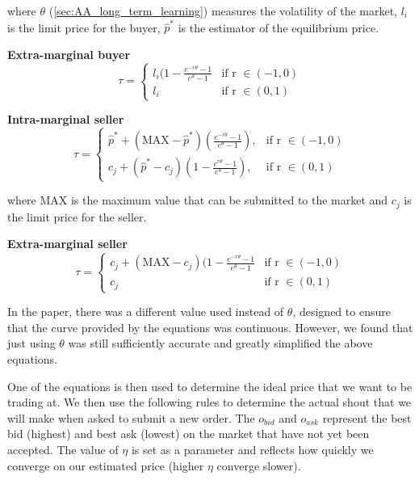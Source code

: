 \documentclass[preprint]{acm_proc_article-sp} %
\begin{document}
where $\theta$ (\ref{sec:AA_long_term_learning}) measures the volatility of the
market, $l_i$ is the limit price for the buyer, $\hat{p}^*$ is the estimator of the
equilibrium price.

\textbf{Extra-marginal buyer}
\begin{equation}
    \label{eqn:extrabuyer}
    \tau =
    \begin{cases}
        l_i(1-\frac{e^{-r\theta}-1}{e^\theta-1} &  \text{if r } \in (-1,0)  \\
        l_i & \text{if r } \in (0,1)
    \end{cases}
\end{equation}

\textbf{Intra-marginal seller}
\begin{equation}
    \label{eqn:intraseller}
    \tau =
    \begin{cases}
        \hat{p}^* + (\text{MAX}-\hat{p}^*)( \frac{e^{-r\theta}-1}{e^{\theta}-1}), &  \text{if r } \in (-1,0)  \\
        c_j + (\hat{p}^*-c_j)(1-\frac{e^{r\theta}-1}{e^\theta-1}), & \text{if r } \in (0,1)
    \end{cases}
\end{equation}

where MAX is the maximum value that can be submitted to the market and $c_j$ is
the limit price for the seller.

\textbf{Extra-marginal seller}
\begin{equation}
    \label{eqn:extraseller}
    \tau =
    \begin{cases}
        c_j + (\text{MAX}-c_j)(1-\frac{e^{-r\theta}-1}{e^\theta-1} &  \text{if r } \in (-1,0)  \\
        c_j & \text{if r } \in (0,1)
    \end{cases}
\end{equation}

In the paper, there was a different value used instead of $\theta$, designed to
ensure that the curve provided by the equations was continuous. However, we
found that just using $\theta$ was still sufficiently accurate and greatly
simplified the above equations.

One of the equations is then used to determine the ideal price that we want to
be trading at. We then use the following rules to determine the actual shout
that we will make when asked to submit a new order. The $o_{bid}$ and $o_{ask}$
represent the best bid (highest) and best ask (lowest) on the market that have
not yet been accepted. The value of $\eta$ is set as a parameter and reflects
how quickly we converge on our estimated price (higher $\eta$ converge slower).
\end{document}
